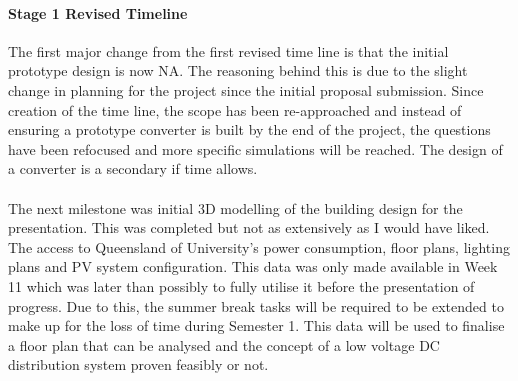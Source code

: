 \paragraph{Stage 1 Revised Timeline}

The first major change from the first revised time line is that the initial prototype design is now NA. The reasoning behind this is due to the slight change in planning for the project since the initial proposal submission. Since creation of the time line, the scope has been re-approached and instead of ensuring a prototype converter is built by the end of the project, the questions have been refocused and more specific simulations will be reached. The design of a converter is a secondary if time allows. 

\paragraph{}
The next milestone was initial 3D modelling of the building design for the presentation. This was completed but not as extensively as I would have liked. The access to Queensland of University's power consumption, floor plans, lighting plans and PV system configuration. This data was only made available in Week 11 which was later than possibly to fully utilise it before the presentation of progress. Due to this, the summer break tasks will be required to be extended to make up for the loss of time during Semester 1. This data will be used to finalise a floor plan that can be analysed and the concept of a low voltage DC distribution system proven feasibly or not.  

